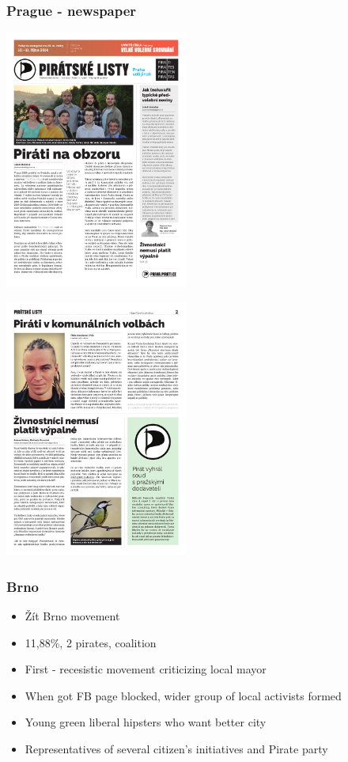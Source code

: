 \begin{frame}
	\frametitle{Prague - newspaper}
	\begin{center}
	\begin{multicols}{2}
		\includegraphics[width = 0.45\textwidth]{listy1.pdf}
		
		\includegraphics[width = 0.45\textwidth]{listy2.pdf}
	\end{multicols}
	\end{center}
\end{frame}
\begin{frame}
	\frametitle{Brno}
	\begin{itemize}
		\item \v{Z}\'it Brno movement
		\item 11,88\%, 2 pirates, coalition
		\item First - recesistic movement criticizing local mayor
		\item When got FB page blocked, wider group of local activists formed
		\item Young green liberal hipsters who want better city
		\item Representatives of several citizen's initiatives and Pirate party
	\end{itemize}
\end{frame}
